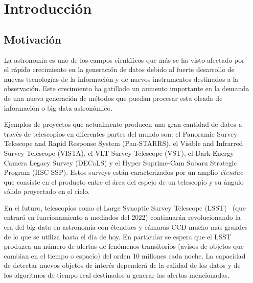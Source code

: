 \chapter{Introducción}
\label{ch:introduction}

\section{Motivaci\'on}
La astronomía es uno de los campos científicos que más se ha visto afectado por el rápido crecimiento en la generación de datos debido al fuerte desarrollo de nuevas tecnologías de la información y  de nuevos instrumentos destinados a la observación. Este crecimiento ha gatillado un aumento importante en la demanda de una nueva generaci\'on de m\'etodos que puedan procesar esta oleada de informaci\'on o big data astron\'omico.
\bigskip

Ejemplos de proyectos que actualmente producen una gran cantidad de datos a trav\'es de telescopios en diferentes partes del mundo son: el Panoramic Survey Telescope and Rapid Response System (Pan-STARRS)\cite{pan}, el Visible and Infrarred Survey Telescope (VISTA)\cite{vista}, el VLT Survey Telescope (VST)\cite{vst}, el Dark Energy Camera Legacy Survey (DECaLS)\cite{decals} y el Hyper Suprime-Cam Subaru Strategic Program (HSC SSP)\cite{ssp}. Estos surveys est\'an caracterizados por un amplio \textit{\'etendue}  que consiste en el producto entre el \'area del espejo de un telescopio y su \'angulo s\'olido proyectado en el cielo.
\bigskip

En el futuro, telescopios como el Large Synoptic Survey Telescope (LSST)~\cite{lsst} (que entrará en funcionamiento a mediados del 2022) continuar\'an revolucionando la era del big data en astronom\'ia con \'etendues y c\'amaras CCD mucho m\'as grandes de lo que se utiliza hasta el d\'ia de hoy. En particular se espera que el LSST produzca un n\'umero de alertas de fen\'omenos transitorios (avisos de objetos que cambian en el tiempo o espacio) del orden 10 millones cada noche. La capacidad de detectar nuevos objetos de inter\'es depender\'a de la calidad de los datos y de los algoritmos de tiempo real  destinados a generar las alertas mencionadas. 
\bigskip

